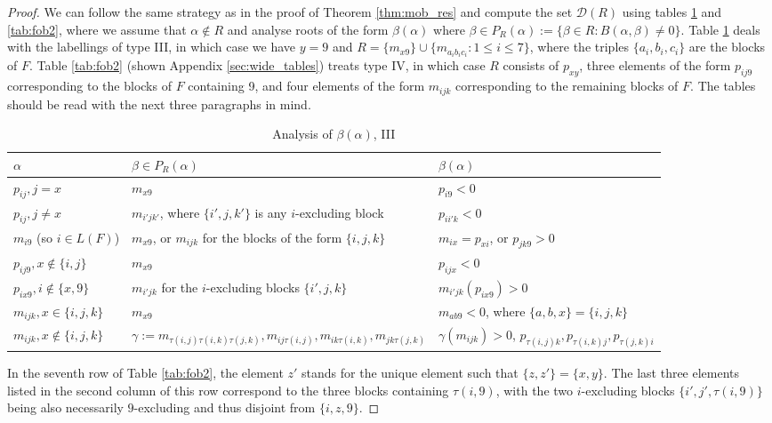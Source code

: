 \documentclass[10pt,a4paper]{amsart}
\numberwithin{equation}{section}
\newcommand{\al}{\alpha}
\newcommand{\be}{\beta}
\newcommand{\res}{\mathscr{D}}
\newcommand{\pra}{P_R(\al)}
\begin{document}
\begin{proof}
We can follow the same strategy as in the proof of Theorem \ref{thm:mob_res} and
compute the set $\res(R)$ using tables  \ref{tab:fob1} and \ref{tab:fob2}, where
we assume that $\al\notin R$ and analyse roots of the form $\be(\al)$ where
$\be\in \pra:=\{\be\in R: B(\al,\be)\neq 0\}$. Table \ref{tab:fob1} deals with
the labellings of type III, in which case we have $y=9$ and $R=\{m_{x9}\}\cup
\{m_{a_ib_ic_i}:1\le i\le 7\}$, where the triples $\{a_i,b_i,c_i\}$ are the
blocks of $F$. Table \ref{tab:fob2} (shown Appendix \ref{sec:wide_tables})
treats type IV, in which case $R$ consists of $p_{xy}$, three elements of the
form $p_{ij9}$ corresponding to the blocks of $F$ containing 9, and four
elements of the form $m_{ijk}$ corresponding to the remaining blocks of $F$. 
The tables should be read with the next three paragraphs in mind.

\begin{table}[h!]
  \centering
\begin{tabular}{@{}lll@{}}
\toprule
  $\al$ & $\be\in \pra$ & $\be(\al)$ \\
  \midrule
  $p_{ij}, j=x$ & $m_{x9}$  & $p_{i9}<0$ \\
  $p_{ij}, j\neq x$ & $m_{i'jk'}$, where $\{i',j,k'\}$ is any
  $i$-excluding block & $p_{ii'k}<0$ \\
  \midrule
  $m_{i9}$ (so $i\in L(F)$) & $m_{x9}$, or $m_{ijk}$ for the blocks of the form
  $\{i,j,k\}$  & $m_{ix}=p_{xi}$, or $p_{jk9}>0$ \\
  \midrule
  $p_{ij9}, x\notin \{i,j\}$ & $m_{x9}$ & $p_{ijx}<0$\\
  $p_{ix9}, i\notin \{x,9\}$ & $m_{i'jk}$ for the $i$-excluding blocks
  $\{i',j,k\}$ & $m_{i'jk}(p_{ix9})>0$\\
  \midrule
  $m_{ijk}, x\in \{i,j,k\}$ & $m_{x9}$ & $m_{ab9}<0$, where
  $\{a,b,x\}=\{i,j,k\}$\\
  $m_{ijk}, x\notin \{i,j,k\}$ & $\gamma:=m_{\tau(i,j)\tau(i,k)\tau(j,k)}, m_{ij\tau(i,j)},m_{ik\tau(i,k)}, m_{jk\tau(j,k)}
  $ &
  $\gamma(m_{ijk})>0$, $p_{\tau(i,j)k},p_{\tau(i,k)j}, p_{\tau(j,k)i}$\\
  \bottomrule
\end{tabular}
\caption{Analysis of $\be(\al)$, III}
\label{tab:fob1}
\end{table}


In the seventh row of Table \ref{tab:fob2}, the element $z'$ stands for the
unique element such that $\{z,z'\}=\{x,y\}$. The last three elements listed in
the second column of this row correspond to the three blocks containing
$\tau(i,9)$, with the two $i$-excluding blocks $\{i',j',\tau(i,9)\}$ being also
necessarily $9$-excluding and thus disjoint from $\{i,z,9\}$. 


\end{proof}
\end{document}
